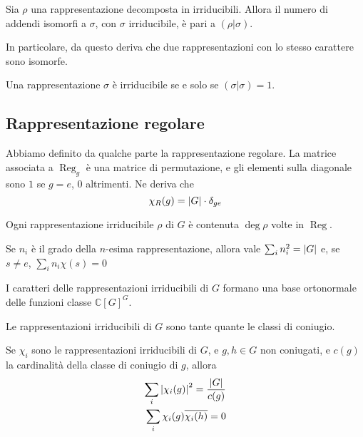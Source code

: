 \documentclass[a4paper,10pt,oneside]{math_article}
\newcommand{\herm}[2]{\left(#1 | #2\right)}
\newcommand{\class}[1]{\mathbb C[#1]^#1}
\DeclareMathOperator{\Reg}{Reg}
\let\conj\overline
\begin{document}
    \begin{myprop}
     Sia $\rho$ una rappresentazione decomposta in irriducibili. Allora il numero di addendi isomorfi a $\sigma$, con $\sigma$ irriducibile, è pari a $\herm\rho\sigma$.
    \end{myprop}

    In particolare, da questo deriva che due rappresentazioni con lo stesso carattere sono isomorfe.
    
    \begin{mytheorem}
     Una rappresentazione $\sigma$ è irriducibile se e solo se $\herm\sigma\sigma=1$.
    \end{mytheorem}

   \subsection{Rappresentazione regolare}
    Abbiamo definito da qualche parte la rappresentazione regolare. La matrice associata a $\Reg_g$ è una matrice di permutazione, e gli elementi sulla diagonale sono $1$ se $g=e$, $0$ altrimenti. Ne deriva che 
    \[
     \chi_R(g) = \left|G\right| \cdot \delta_{ge}
    \]
    
    \begin{myprop}
     Ogni rappresentazione irriducibile $\rho$ di $G$ è contenuta $\deg\rho$ volte in $\Reg$.
    \end{myprop}

    \begin{myprop}
     Se $n_i$ è il grado della $n$-esima rappresentazione, allora vale $\sum_i n_i^2 = \left|G\right|$ e, se $s\ne e$, $\sum_i n_i \chi(s)=0$
     
    \end{myprop}

    \begin{mytheorem}
     I caratteri delle rappresentazioni irriducibili di $G$ formano una base ortonormale delle funzioni classe $\class G$.
    \end{mytheorem}
    
    \begin{mytheorem}
     Le rappresentazioni irriducibili di $G$ sono tante quante le classi di coniugio.
    \end{mytheorem}
    
    \begin{myprop}
     Se $\chi_i$ sono le rappresentazioni irriducibili di $G$, e $g,h\in G$ non coniugati, e $c(g)$ la cardinalità della classe di coniugio di $g$, allora 
     \begin{align*}
	\sum_i \abs{\chi_i(g)}^2 = \frac {\abs G}{c(g)}\\
	\sum_i \chi_i(g)\conj{\chi_i(h)} = 0
     \end{align*}
    \end{myprop}
\end{document}
